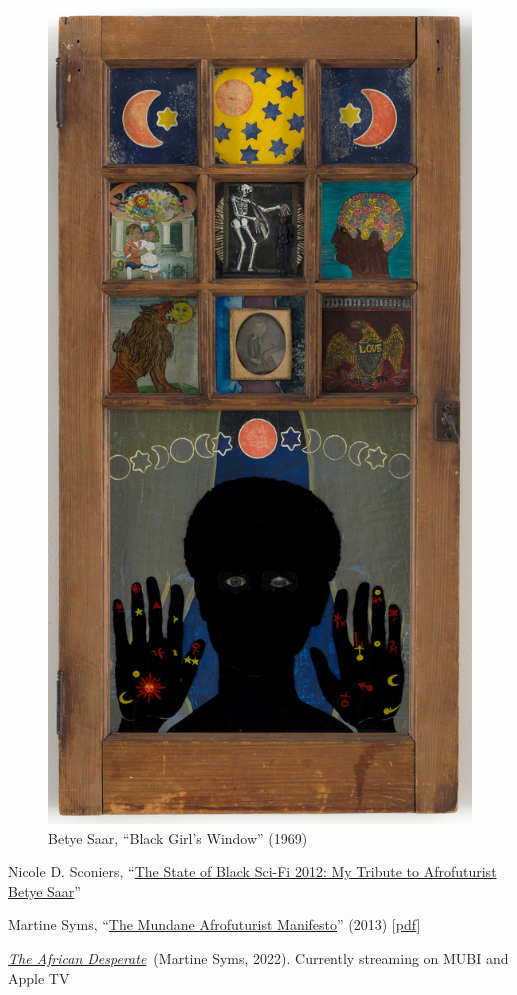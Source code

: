 \documentclass[
  letterpaper,
  DIV=11,
  numbers=noendperiod]{scrartcl}
\begin{document}
\begin{figure}

{\centering \includegraphics{../img/betye-saar.jpg}

}

\caption{Betye Saar, ``Black Girl's Window'' (1969)}

\end{figure}

Nicole D. Sconiers,
``\href{http://nicolesconiers.com/blog/2012/02/20/the-state-of-black-sci-fi-2012-my-tribute-to-afrofuturist-betye-saar/}{The
State of Black Sci-Fi 2012: My Tribute to Afrofuturist Betye Saar}''

Martine Syms,
``\href{http://thirdrailquarterly.org/martine-syms-the-mundane-afrofuturist-manifesto/}{The
Mundane Afrofuturist Manifesto}'' (2013)
{[}\href{https://canvas.emerson.edu/courses/1932613/files/145601589?wrap=1}{pdf}{]}

\href{https://mubi.com/films/the-african-desperate}{\emph{The African
Desperate}}~(Martine Syms, 2022). Currently streaming on MUBI and Apple
TV
\end{document}
